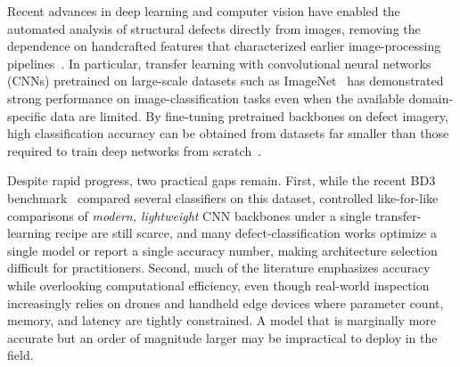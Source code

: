 \documentclass[conference]{IEEEtran}
\begin{document}
Recent advances in deep learning and computer vision have enabled the automated analysis of structural defects directly from images, removing the dependence on handcrafted features that characterized earlier image-processing pipelines~\cite{ref5}. In particular, transfer learning with convolutional neural networks (CNNs) pretrained on large-scale datasets such as ImageNet~\cite{ref23} has demonstrated strong performance on image-classification tasks even when the available domain-specific data are limited. By fine-tuning pretrained backbones on defect imagery, high classification accuracy can be obtained from datasets far smaller than those required to train deep networks from scratch~\cite{ref22}.

Despite rapid progress, two practical gaps remain. First, while the recent BD3 benchmark~\cite{ref40} compared several classifiers on this dataset, controlled like-for-like comparisons of \emph{modern, lightweight} CNN backbones under a single transfer-learning recipe are still scarce, and many defect-classification works optimize a single model or report a single accuracy number, making architecture selection difficult for practitioners. Second, much of the literature emphasizes accuracy while overlooking computational efficiency, even though real-world inspection increasingly relies on drones and handheld edge devices where parameter count, memory, and latency are tightly constrained. A model that is marginally more accurate but an order of magnitude larger may be impractical to deploy in the field.
\end{document}
